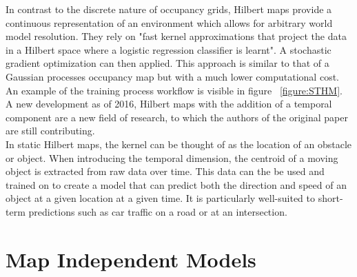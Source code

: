   In contrast to the discrete nature of occupancy grids, Hilbert maps provide a
  continuous representation of an environment which allows for arbitrary world
  model resolution. They rely on "fast kernel approximations that project the
  data in a Hilbert space where a logistic regression classifier is learnt".
  A stochastic gradient optimization can then applied. This approach is similar to
  that of a Gaussian processes occupancy map but with a much lower computational
  cost. An example
  of the training process workflow is visible in figure ~\ref{figure:STHM}.
  A new development as of 2016, Hilbert maps with the addition of a temporal
  component are a new field of research, to which the authors of
  the original paper are still contributing. \cite{Ramos2016, Senanayake2016} \\

  In static Hilbert maps, the kernel can be thought of as the location of an
  obstacle or object. When introducing the temporal dimension, the centroid of a
  moving object is extracted from raw data over time. This data can the be used
  and trained on to create a model that can predict both the direction and speed of an
  object at a given location at a given time. It is particularly well-suited to
  short-term predictions such as car traffic on a road or at an intersection.
  \cite{Senanayake2016} \cite{Senanayake2017} \\

  \section{ Map Independent Models }

